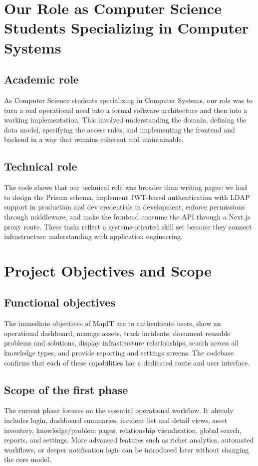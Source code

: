\section{Our Role as Computer Science Students Specializing in Computer Systems}
\subsection{Academic role}
As Computer Science students specializing in Computer Systems, our role was to turn a real operational need into a formal software architecture and then into a working implementation. This involved understanding the domain, defining the data model, specifying the access rules, and implementing the frontend and backend in a way that remains coherent and maintainable.

\subsection{Technical role}
The code shows that our technical role was broader than writing pages: we had to design the Prisma schema, implement JWT-based authentication with LDAP support in production and dev credentials in development, enforce permissions through middleware, and make the frontend consume the API through a Next.js proxy route. These tasks reflect a systems-oriented skill set because they connect infrastructure understanding with application engineering.

\section{Project Objectives and Scope}
\subsection{Functional objectives}
The immediate objectives of MapIT are to authenticate users, show an operational dashboard, manage assets, track incidents, document reusable problems and solutions, display infrastructure relationships, search across all knowledge types, and provide reporting and settings screens. The codebase confirms that each of these capabilities has a dedicated route and user interface.

\subsection{Scope of the first phase}
The current phase focuses on the essential operational workflow. It already includes login, dashboard summaries, incident list and detail views, asset inventory, knowledge/problem pages, relationship visualization, global search, reports, and settings. More advanced features such as richer analytics, automated workflows, or deeper notification logic can be introduced later without changing the core model.

